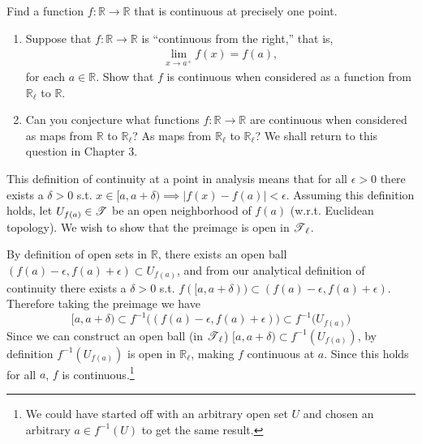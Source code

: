   \begin{exercise}[Munkres 18.6]
    Find a function $f : \mathbb{R} \to \mathbb{R}$ that is continuous at precisely one point.
  \end{exercise}

  \begin{exercise}[Munkres 18.7]
    \begin{enumerate}
      \item Suppose that $f : \mathbb{R} \to \mathbb{R}$ is ``continuous from the right,'' that is,
      \begin{align*}
        \lim_{x \to a^+} f(x) = f(a),
      \end{align*}
      for each $a \in \mathbb{R}$. Show that $f$ is continuous when considered as a function from $\mathbb{R}_\ell$ to $\mathbb{R}$.
      \item Can you conjecture what functions $f : \mathbb{R} \to \mathbb{R}$ are continuous when considered as maps from $\mathbb{R}$ to $\mathbb{R}_\ell$? As maps from $\mathbb{R}_\ell$ to $\mathbb{R}_\ell$? We shall return to this question in Chapter 3.
    \end{enumerate}
  \end{exercise}
  \begin{solution}
    This definition of continuity at a point in analysis means that for all $\epsilon > 0$ there exists a $\delta > 0$ s.t. $x \in [a, a + \delta) \implies |f(x) - f(a)| < \epsilon$. Assuming this definition holds, let $U_{f(a)} \in \operatorname{\mathscr{T}}$ be an open neighborhood of $f(a)$ (w.r.t. Euclidean topology). We wish to show that the preimage is open in $\operatorname{\mathscr{T}}_\ell$. 

    By definition of open sets in $\mathbb{R}$, there exists an open ball $(f(a) - \epsilon, f(a) + \epsilon) \subset U_{f(a)}$, and from our analytical definition of continuity there exists a $\delta > 0$ s.t. $f([a, a + \delta)) \subset (f(a) - \epsilon, f(a) + \epsilon)$. Therefore taking the preimage we have 
    \begin{equation}
      [a, a+\delta) \subset f^{-1} \big( (f(a) - \epsilon, f(a) + \epsilon ) \big) \subset f^{-1} \big( U_{f(a)} \big)
    \end{equation}
    Since we can construct an open ball (in $\operatorname{\mathscr{T}}_\ell$) $[a, a + \delta) \subset f^{-1} (U_{f(a)})$, by definition $f^{-1} (U_{f(a)})$ is open in $\mathbb{R}_\ell$, making $f$ continuous at $a$. Since this holds for all $a$, $f$ is continuous.\footnote{We could have started off with an arbitrary open set $U$ and chosen an arbitrary $a \in f^{-1} (U)$ to get the same result.} 
  \end{solution}

